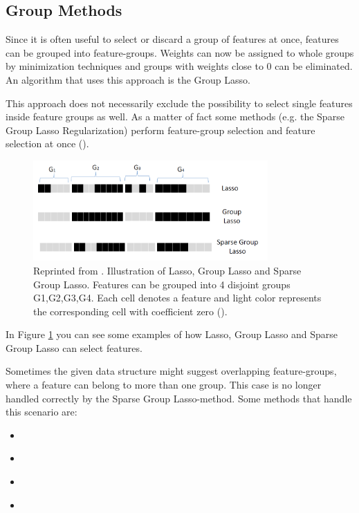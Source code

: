 \subsection{Group Methods}
\label{sec:methods.structured.group}

  
Since it is often useful to select or discard a group of features at once,
features can be grouped into feature-groups. Weights can now be assigned to
whole groups by minimization techniques and groups with weights close to $0$ can be
eliminated. An algorithm that uses this approach is the Group Lasso. 

This approach does not necessarily exclude the possibility to select single
features inside feature groups as well. As a matter of fact some methods
(e.g. the Sparse Group Lasso Regularization) perform feature-group selection and
feature selection at once (\cite{Tang:04}).

\begin{figure}[!ht]
  \centering 
  \includegraphics[width=0.8\textwidth]{chapters/methods/structured/group_lasso}
  \caption{Reprinted from \cite{Tang:04}. Illustration of Lasso, Group Lasso
  and Sparse Group Lasso.
  Features can be grouped into 4 disjoint groups {G1,G2,G3,G4}. Each cell denotes a feature and light color
represents the corresponding cell with coefficient zero (\cite{Tang:04}).}
  \label{fig:methods.structured.group.lasso}
\end{figure}

In Figure \ref{fig:methods.structured.group.lasso} you can see some examples of
how Lasso, Group Lasso and Sparse Group Lasso can select features. 

Sometimes the given data structure might suggest overlapping feature-groups,
where a feature can belong to more than one group. This case is no longer
handled correctly by the Sparse Group Lasso-method. Some methods that handle
this scenario are:

\begin{itemize}
  \item \cite{Liu:10}
  \item \cite{Kim:10}
  \item \cite{Jenatton:10}
  \item \cite{Jacob:09}
\end{itemize}






